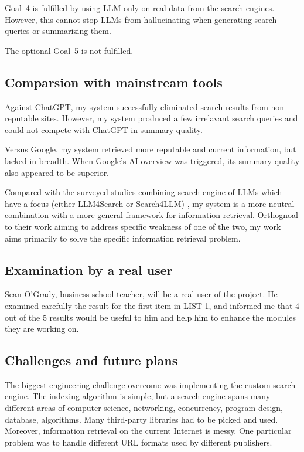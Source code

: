 \documentclass[final-report]{report-template}
\begin{document}
Goal~4 is fulfilled by using LLM only on real data from the search engines.
However, this cannot stop LLMs from hallucinating when generating search
queries or summarizing them.

The optional Goal~5 is not fulfilled.

\subsection{Comparsion with mainstream tools}
Against ChatGPT, my system successfully eliminated search results from
non-reputable sites. However, my system produced a few irrelavant search
queries and could not compete with ChatGPT in summary quality.

Versus Google, my system retrieved more reputable and current
information, but lacked in breadth. When Google's AI overview was triggered,
its summary quality also appeared to be superior.

Compared with the surveyed studies combining search engine of LLMs which have a
focus (either LLM4Search or Search4LLM) \cite{llm.meet.search.1}, my system is
a more neutral combination with a more general framework for information
retrieval. Orthognoal to their work aiming to address specific weakness of one
of the two, my work aims primarily to solve the specific information retrieval
problem.

\subsection{Examination by a real user}
Sean O'Grady, business school teacher, will be a real user of the
project. He examined carefully the result for the first item in LIST 1, and
informed me that 4 out of the 5 results would be useful to him and help him to
enhance the modules they are working on.

\subsection{Challenges and future plans}
The biggest engineering challenge overcome was implementing the custom search
engine. The indexing algorithm is simple, but a search engine spans
many different areas of computer science, networking, concurrency, program
design, database, algorithms. Many third-party libraries had to be picked and
used. Moreover, information retrieval on the current Internet is messy. One
particular problem was to handle different URL formats used by different
publishers.
\end{document}
